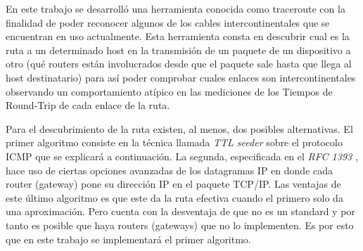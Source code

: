 En este trabajo se desarrolló una herramienta conocida como traceroute con
la finalidad de poder reconocer algunos de los cables intercontinentales
que se encuentran en uso actualmente. Esta herramienta
consta en descubrir cual es la ruta a un determinado host en la transmisión 
de un paquete de un dispositivo a otro (qué routers están
involucrados desde que el paquete sale hasta que llega al host destinatario)
para así poder comprobar cuales enlaces son intercontinentales 
observando un comportamiento atípico en las mediciones de los
Tiempos de Round-Trip de cada enlace de la ruta.

Para el descubrimiento de la ruta existen, al menos, dos posibles alternativas. El primer
algoritmo consiste en la técnica llamada \emph{TTL seeder} sobre el protocolo
ICMP que se explicará a continuación. La segunda, especificada en el \emph{RFC
1393} \cite{rfc1393}, hace uso de ciertas opciones avanzadas de los datagramas IP en donde
cada router (gateway) pone su dirección IP en el paquete TCP/IP. Las ventajas
de este último algoritmo es que este da la ruta efectiva
cuando el primero solo da una aproximación. Pero cuenta con la desventaja de que no es un standard
y por tanto es posible que haya routers (gateways) que no lo
implementen. Es por esto que en este trabajo se implementará el primer
algoritmo.
